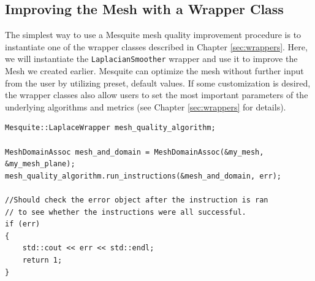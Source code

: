 \subsection{Improving the Mesh with a Wrapper Class}
\label{sec:tutWrapper}
The simplest way to use a Mesquite mesh quality improvement
procedure is to instantiate one of the wrapper classes described in Chapter 
\ref{sec:wrappers}. Here, we will instantiate the
\texttt{LaplacianSmoother} wrapper and use it to improve 
the Mesh we created earlier.  Mesquite can optimize the mesh
without further input from the user by utilizing preset, default
values.  If some customization is desired, the wrapper classes also
allow users to set the most important parameters of the underlying
algorithms and metrics (see Chapter 
\ref{sec:wrappers} for details).
\begin{verbatim}
Mesquite::LaplaceWrapper mesh_quality_algorithm;

MeshDomainAssoc mesh_and_domain = MeshDomainAssoc(&my_mesh, &my_mesh_plane);
mesh_quality_algorithm.run_instructions(&mesh_and_domain, err);

//Should check the error object after the instruction is ran
// to see whether the instructions were all successful.
if (err) 
{
    std::cout << err << std::endl;
    return 1;
}
\end{verbatim}

